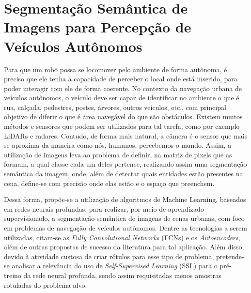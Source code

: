 \documentclass{atividade_fftt}
\def\Autor{Gabriel Toffanetto França da Rocha -- 289320}
\begin{document}

\cabecalhoalone

\autor

\titulo


\espacamentoumemeio





\section*{Segmentação Semântica de Imagens para Percepção de \\Veículos Autônomos}

Para que um robô possa se locomover pelo ambiente de forma autônoma, é preciso que ele tenha a capacidade de perceber o local onde está inserido, para poder interagir com ele de forma coerente. No contexto da navegação urbana de veículos autônomos, o veículo deve ser capaz de identificar no ambiente o que é rua, calçada, pedestres, postes, árvores, outros veículos, etc., com principal objetivo de diferir o que é área navegável do que são obstáculos. Existem muitos métodos e sensores que podem ser utilizados para tal tarefa, como por exemplo LiDARs e radares. Contudo, de forma mais natural, a câmera é o sensor que mais se aproxima da maneira como nós, humanos, percebemos o mundo. Assim, a utilização de imagens leva ao problema de definir, na matriz de pixels que as formam, a qual classe cada um deles pertence, realizando assim uma segmentação semântica da imagem, onde, além de detectar quais entidades estão presentes na cena, define-se com precisão onde elas estão e o espaço que preenchem.

Dessa forma, propõe-se a utilização de algoritmos de Machine Learning, baseados em redes neurais profundas, para realizar, por meio de aprendizado supervisionado, a segmentação semântica de imagens de cenas urbanas, com foco em problemas de navegação de veículos autônomos. Dentre as tecnologias a serem utilizadas, citam-se as \textit{Fully Convolutional Networks} (FCNs) e os \textit{Autoencoders}, além de outras propostas de sucesso da literatura para tal aplicação. Além disso, devido à atividade custosa de criar rótulos para esse tipo de problema, pretende-se analisar a relevância do uso de \textit{Self-Supervised Learning} (SSL) para o pré-treino da rede neural profunda, sendo assim requisitadas menos amostras rotuladas do problema-alvo.








\end{document}
